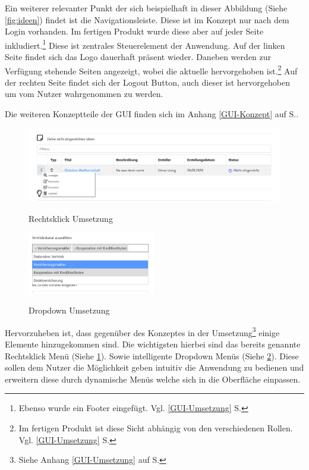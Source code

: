 Ein weiterer relevanter Punkt der sich beispielhaft in dieser Abbildung (Siehe \cref{fig:ideen}) findet ist die Navigationsleiste. Diese ist im Konzept nur nach dem Login vorhanden. Im fertigen Produkt wurde diese aber auf jeder Seite inkludiert.\footnote{Ebenso wurde ein Footer eingefügt. Vgl. \ref{GUI-Umsetzung} S.\pageref{GUI-Umsetzung}}
Diese ist zentrales Steuerelement der Anwendung. Auf der linken Seite findet sich das Logo dauerhaft präsent wieder. Daneben werden zur Verfügung stehende Seiten angezeigt, wobei die aktuelle hervorgehoben ist.\footnote{Im fertigen Produkt ist diese Sicht abhängig von den verschiedenen Rollen. Vgl. \ref{GUI-Umsetzung} S.\pageref{GUI-Umsetzung}} Auf der rechten Seite findet sich der Logout Button, auch dieser ist hervorgehoben um vom Nutzer wahrgenommen zu werden.

Die weiteren Konzeptteile der GUI finden sich im Anhang \ref{GUI-Konzept} auf S.\pageref{GUI-Konzept}.

\begin{figure}[hbt]
    \centering
    \begin{minipage}[t]{1\textwidth}
        \caption{Rechtsklick Umsetzung}
        \includegraphics[width=1\textwidth]{img/rechtsklick-umsetzung.png}\\
        \label{fig:rechtsklick}
    \end{minipage}
\end{figure}

\begin{figure}[hbt]
    \centering
    \begin{minipage}[t]{1\textwidth}
        \caption{Dropdown Umsetzung}
        \includegraphics[width=0.5\textwidth]{img/dropdown-umsetzung.png}\\
        \label{fig:dropdown}
    \end{minipage}
\end{figure}

Hervorzuheben ist, dass gegenüber des Konzeptes in der Umsetzung\footnote{Siehe Anhang \ref{GUI-Umsetzung} auf S.\pageref{GUI-Umsetzung}} einige Elemente hinzugekommen sind. Die wichtigsten hierbei sind das bereits genannte Rechtsklick Menü (Siehe \cref{fig:rechtsklick}). Sowie intelligente Dropdown Menüs (Siehe \cref{fig:dropdown}).
Diese sollen dem Nutzer die Möglichkeit geben intuitiv die Anwendung zu bedienen und erweitern diese durch dynamische Menüs welche sich in die Oberfläche einpassen.
